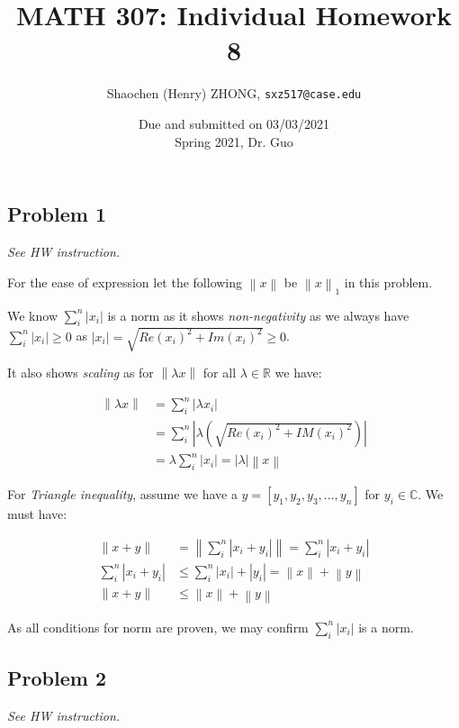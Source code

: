 \documentclass[11pt]{article}
\newcommand{\ilc}{\texttt}
\providecommand{\norm}[1]{\left\lVert #1 \right\rVert}
\providecommand{\len}[1]{\left| #1 \right|}
\begin{document}
\title{\textbf{MATH 307: Individual Homework 8}}


\author{Shaochen (Henry) ZHONG, \ilc{sxz517@case.edu}}

\date{Due and submitted on 03/03/2021 \\ Spring 2021, Dr. Guo}
\maketitle



\subsection*{Problem 1}
\textit{See HW instruction.}\newline

For the ease of expression let the following $\norm{x}$ be $\norm{x}_1$ in this problem.

We know $\sum_i^n \len{x_i}$ is a norm as it shows \textit{non-negativity} as we always have $\sum_i^n \len{x_i} \geq 0$ as $\len{x_i} = \sqrt{Re(x_i)^2 + Im(x_i)^2} \geq 0$.

It also shows \textit{scaling} as for $\norm{\lambda x}$ for all $\lambda \in \mathbb{R}$ we have:

\begin{align*}
    \norm{\lambda x} &= \sum_i^n \len{\lambda x_i} \\
    &= \sum_i^n \len{\lambda (\sqrt{Re(x_i)^2 + IM(x_i)^2})} \\
    &= \lambda \sum_i^n \len{x_i} = \len{\lambda} \norm{x}
\end{align*}

For \textit{Triangle inequality}, assume we have a $y = [y_1, y_2, y_3, \dots, y_n]$ for $y_i \in \mathbb{C}$. We must have:

\begin{align*}
    \norm{x + y} &= \norm{\sum_i^n \len{x_i + y_i}} =\sum_i^n \len{x_i + y_i} \\
    \sum_i^n \len{x_i + y_i} &\leq \sum_i^n \len{x_i} + \len{y_i} = \norm{x} + \norm{y} \\
    \norm{x + y} &\leq \norm{x} + \norm{y}
\end{align*}

As all conditions for norm are proven, we may confirm $\sum_i^n \len{x_i}$ is a norm.

\subsection*{Problem 2}
\textit{See HW instruction.}\newline
\end{document}
